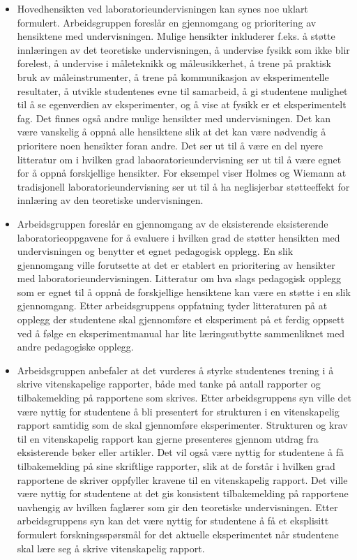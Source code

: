 \documentclass{article}
\begin{document}
\begin{itemize}

\item Hovedhensikten ved laboratorieundervisningen kan synes noe uklart formulert. Arbeidsgruppen foreslår en gjennomgang og prioritering av hensiktene med undervisningen. Mulige hensikter inkluderer f.eks. å støtte innlæringen av det teoretiske undervisningen, å undervise fysikk som ikke blir forelest, å undervise i måleteknikk og måleusikkerhet, å trene på praktisk bruk av måleinstrumenter, å trene på kommunikasjon av eksperimentelle resultater, å utvikle studentenes evne til samarbeid, å gi studentene mulighet til å se egenverdien av eksperimenter, og å vise at fysikk er et eksperimentelt fag. Det finnes også andre mulige hensikter med undervisningen. Det kan være vanskelig å oppnå alle hensiktene slik at det kan være nødvendig å prioritere noen hensikter foran andre. Det ser ut til å være en del nyere litteratur om i hvilken grad labaoratorieundervisning ser ut til å være egnet for å oppnå forskjellige hensikter. For eksempel viser Holmes og Wiemann \cite{Holmes} at tradisjonell laboratorieundervisning ser ut til å ha neglisjerbar støtteeffekt for innlæring av den teoretiske undervisningen. 

\item Arbeidsgruppen foreslår en gjennomgang av de eksisterende eksisterende laboratorieoppgavene for å evaluere i hvilken grad de støtter hensikten med undervisningen og benytter et egnet pedagogisk opplegg. En slik gjennomgang ville forutsette at det er etablert en prioritering av hensikter med laboratorieundervisningen. Litteratur om hva slags pedagogisk opplegg som er egnet til å oppnå de forskjellige hensiktene kan være en støtte i en slik gjennomgang. Etter arbeidsgruppens oppfatning tyder litteraturen på at opplegg der studentene skal gjennomføre et eksperiment på et ferdig oppsett ved å følge en  eksperimentmanual har lite læringsutbytte sammenliknet med andre pedagogiske opplegg.  

\item Arbeidsgruppen anbefaler at det vurderes å styrke studentenes trening i å skrive vitenskapelige rapporter, både med tanke på antall rapporter og tilbakemelding på rapportene som skrives. Etter arbeidsgruppens syn ville det være nyttig for studentene å bli presentert for strukturen i en vitenskapelig rapport samtidig som de skal gjennomføre eksperimenter. Strukturen og krav til en vitenskapelig rapport kan gjerne presenteres gjennom utdrag fra eksisterende bøker eller artikler. Det vil også være nyttig for studentene å få tilbakemelding på sine skriftlige rapporter, slik at de forstår i hvilken grad rapportene de skriver oppfyller kravene til en vitenskapelig rapport. Det ville være nyttig for studentene at det gis konsistent tilbakemelding på rapportene uavhengig av hvilken faglærer som gir den teoretiske undervisningen. Etter arbeidsgruppens syn kan det være nyttig for studentene å få et eksplisitt formulert forskningsspørsmål for det aktuelle eksperimentet når studentene skal lære seg å skrive vitenskapelig rapport. 


\end{itemize}
\end{document}
